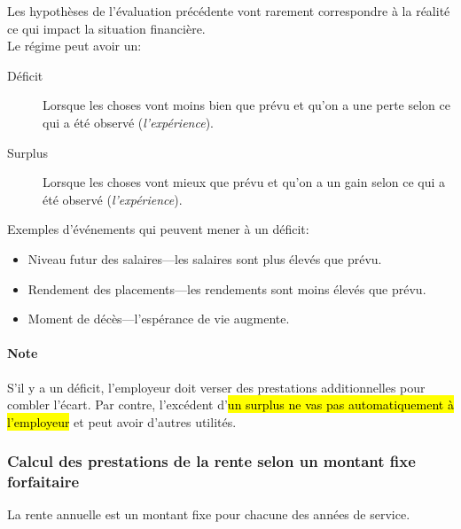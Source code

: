 \documentclass[10pt, french]{article}
\begin{document}
\begin{multicols*}{3}
\begin{definitionNOHFILLsub}
Les hypothèses de l'évaluation précédente vont rarement correspondre à la réalité ce qui impact la situation financière.\\

Le régime peut avoir un:
\begin{description}
	\item[Déficit]	Lorsque les choses vont moins bien que prévu et qu'on a une perte selon ce qui a été observé (\textit{l'expérience}).
	\item[Surplus]	Lorsque les choses vont mieux que prévu et qu'on a un gain selon ce qui a été observé (\textit{l'expérience}).
\end{description}

Exemples d'événements qui peuvent mener à un déficit:
\begin{itemize}[leftmargin = *]
	\item	Niveau futur des salaires---les salaires sont plus élevés que prévu.
	\item	Rendement des placements---les rendements sont moins élevés que prévu.
	\item	Moment de décès---l'espérance de vie augmente.
\end{itemize}


\paragraph{Note} S'il y a un déficit, l'employeur doit verser des prestations additionnelles pour combler l'écart. Par contre, l'excédent d'\hl{un surplus ne vas pas automatiquement à l'employeur} et peut avoir d'autres utilités.
\end{definitionNOHFILLsub}

\subsubsection*{Calcul des prestations de la rente selon un montant fixe forfaitaire}

\begin{definitionNOHFILL}
La rente annuelle est un montant fixe pour chacune des années de service.


\end{definitionNOHFILL}
\end{multicols*}
\end{document}
